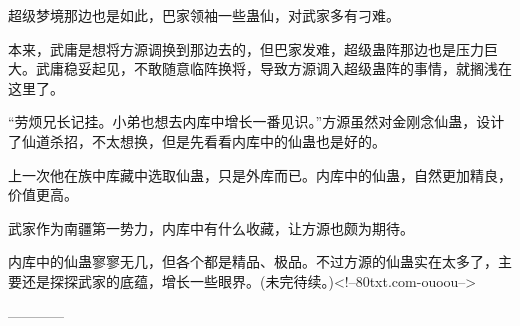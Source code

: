 \begin{this_body}
超级梦境那边也是如此，巴家领袖一些蛊仙，对武家多有刁难。

本来，武庸是想将方源调换到那边去的，但巴家发难，超级蛊阵那边也是压力巨大。武庸稳妥起见，不敢随意临阵换将，导致方源调入超级蛊阵的事情，就搁浅在这里了。

“劳烦兄长记挂。小弟也想去内库中增长一番见识。”方源虽然对金刚念仙蛊，设计了仙道杀招，不太想换，但是先看看内库中的仙蛊也是好的。

上一次他在族中库藏中选取仙蛊，只是外库而已。内库中的仙蛊，自然更加精良，价值更高。

武家作为南疆第一势力，内库中有什么收藏，让方源也颇为期待。

内库中的仙蛊寥寥无几，但各个都是精品、极品。不过方源的仙蛊实在太多了，主要还是探探武家的底蕴，增长一些眼界。(未完待续。)<!--80txt.com-ouoou-->

------------

\end{this_body}

